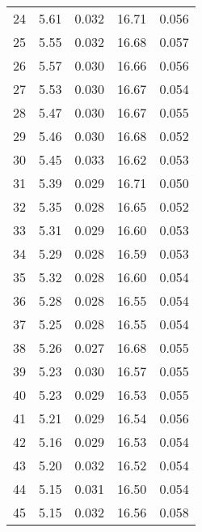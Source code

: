 \begin{table}
\begin{tabular}{c|ll|ll}
24 & 5.61 & 0.032 & 16.71 & 0.056 \\
25 & 5.55 & 0.032 & 16.68 & 0.057 \\
26 & 5.57 & 0.030 & 16.66 & 0.056 \\
27 & 5.53 & 0.030 & 16.67 & 0.054 \\
28 & 5.47 & 0.030 & 16.67 & 0.055 \\
29 & 5.46 & 0.030 & 16.68 & 0.052 \\
30 & 5.45 & 0.033 & 16.62 & 0.053 \\
31 & 5.39 & 0.029 & 16.71 & 0.050 \\
32 & 5.35 & 0.028 & 16.65 & 0.052 \\
33 & 5.31 & 0.029 & 16.60 & 0.053 \\
34 & 5.29 & 0.028 & 16.59 & 0.053 \\
35 & 5.32 & 0.028 & 16.60 & 0.054 \\
36 & 5.28 & 0.028 & 16.55 & 0.054 \\
37 & 5.25 & 0.028 & 16.55 & 0.054 \\
38 & 5.26 & 0.027 & 16.68 & 0.055 \\
39 & 5.23 & 0.030 & 16.57 & 0.055 \\
40 & 5.23 & 0.029 & 16.53 & 0.055 \\
41 & 5.21 & 0.029 & 16.54 & 0.056 \\
42 & 5.16 & 0.029 & 16.53 & 0.054 \\
43 & 5.20 & 0.032 & 16.52 & 0.054 \\
44 & 5.15 & 0.031 & 16.50 & 0.054 \\
45 & 5.15 & 0.032 & 16.56 & 0.058 \\
               \hline
        \end{tabular}
    \end{table}
    \clearpage

